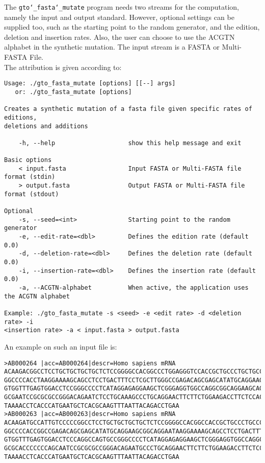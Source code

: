 The \texttt{gto\char`_fasta\char`_mutate} program needs two streams for the computation, namely the input and output standard. However, optional settings can be supplied too, such as the starting point to the random generator, and the edition, deletion and insertion rates. Also, the user can choose to use the ACGTN alphabet in the synthetic mutation. The input stream is a FASTA or Multi-FASTA File.\\
The attribution is given according to:
\begin{lstlisting}
Usage: ./gto_fasta_mutate [options] [[--] args]
   or: ./gto_fasta_mutate [options]

Creates a synthetic mutation of a fasta file given specific rates of editions, 
deletions and additions

    -h, --help                    show this help message and exit

Basic options
    < input.fasta                 Input FASTA or Multi-FASTA file format (stdin)
    > output.fasta                Output FASTA or Multi-FASTA file format (stdout)

Optional
    -s, --seed=<int>              Starting point to the random generator
    -e, --edit-rate=<dbl>         Defines the edition rate (default 0.0)
    -d, --deletion-rate=<dbl>     Defines the deletion rate (default 0.0)
    -i, --insertion-rate=<dbl>    Defines the insertion rate (default 0.0)
    -a, --ACGTN-alphabet          When active, the application uses the ACGTN alphabet

Example: ./gto_fasta_mutate -s <seed> -e <edit rate> -d <deletion rate> -i 
<insertion rate> -a < input.fasta > output.fasta
\end{lstlisting}
An example on such an input file is:
\begin{lstlisting}
>AB000264 |acc=AB000264|descr=Homo sapiens mRNA 
ACAAGACGGCCTCCTGCTGCTGCTGCTCTCCGGGGCCACGGCCCTGGAGGGTCCACCGCTGCCCTGCTGCCATTGTCCCC
GGCCCCACCTAAGGAAAAGCAGCCTCCTGACTTTCCTCGCTTGGGCCGAGACAGCGAGCATATGCAGGAAGCGGCAGGAA
GTGGTTTGAGTGGACCTCCGGGCCCCTCATAGGAGAGGAAGCTCGGGAGGTGGCCAGGCGGCAGGAAGCAGGCCAGTGCC
GCGAATCCGCGCGCCGGGACAGAATCTCCTGCAAAGCCCTGCAGGAACTTCTTCTGGAAGACCTTCTCCACCCCCCCAGC
TAAAACCTCACCCATGAATGCTCACGCAAGTTTAATTACAGACCTGAA
>AB000263 |acc=AB000263|descr=Homo sapiens mRNA 
ACAAGATGCCATTGTCCCCCGGCCTCCTGCTGCTGCTGCTCTCCGGGGCCACGGCCACCGCTGCCCTGCCCCTGGAGGGT
GGCCCCACCGGCCGAGACAGCGAGCATATGCAGGAAGCGGCAGGAATAAGGAAAAGCAGCCTCCTGACTTTCCTCGCTTG
GTGGTTTGAGTGGACCTCCCAGGCCAGTGCCGGGCCCCTCATAGGAGAGGAAGCTCGGGAGGTGGCCAGGCGGCAGGAAG
GCGCACCCCCCCAGCAATCCGCGCGCCGGGACAGAATGCCCTGCAGGAACTTCTTCTGGAAGACCTTCTCCTCCTGCAAA
TAAAACCTCACCCATGAATGCTCACGCAAGTTTAATTACAGACCTGAA
\end{lstlisting}

